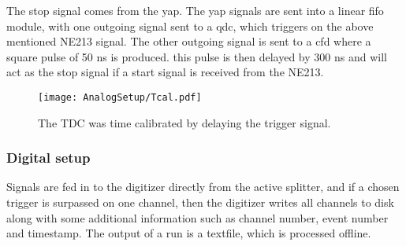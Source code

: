 \documentclass[main.tex]{subfiles}
\begin{document}
The stop signal comes from the yap. The yap signals are sent into a linear fifo module, with one outgoing signal sent to a qdc, which triggers on the above mentioned NE213 signal. %
The other outgoing signal is sent to a cfd where a square pulse of 50 ns is produced. this pulse is then delayed by 300 ns and will act as the stop signal if a start signal is received from the NE213. %

\begin{figure}[ht]
	\centering
    	\texttt{[image: AnalogSetup/Tcal.pdf]}
        \caption{The TDC was time calibrated by delaying the trigger signal.}
	    \label{fig:digitizer_image} 
\end{figure}
\newpage
\subsubsection{Digital setup}
Signals are fed in to the digitizer directly from the active splitter, and if a chosen trigger is surpassed on one channel, then the digitizer writes all channels to disk along with some additional information such as channel number, event number and timestamp. 
The output of a run is a textfile, which is processed offline. 

\newpage
\end{document}
